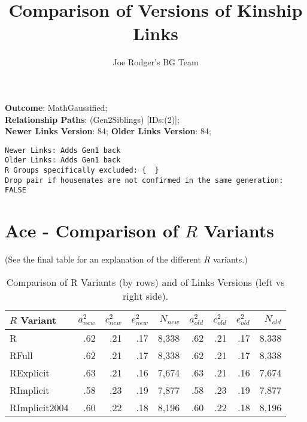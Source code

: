 \documentclass{article}\usepackage[]{graphicx}\usepackage[]{color}
\title{Comparison of Versions of Kinship Links}
\author{Joe Rodger's BG Team}
\makeatletter
\newenvironment{kframe}{%
 \def\at@end@of@kframe{}%
 \ifinner\ifhmode%
  \def\at@end@of@kframe{\end{minipage}}%
  \begin{minipage}{\columnwidth}%
 \fi\fi%
 \def\FrameCommand##1{\hskip\@totalleftmargin \hskip-\fboxsep
 \colorbox{shadecolor}{##1}\hskip-\fboxsep
     \hskip-\linewidth \hskip-\@totalleftmargin \hskip\columnwidth}%
 \MakeFramed {\advance\hsize-\width
   \@totalleftmargin\z@ \linewidth\hsize
   \@setminipage}}%
 {\par\unskip\endMakeFramed%
 \at@end@of@kframe}
\newenvironment{knitrout}{}{} %
\makeatother
\begin{document}
\maketitle
\setcounter{totalnumber}{8} %

\setlength{\parindent}{0pt}%











\textbf{Outcome}: MathGaussified;\\
\textbf{Relationship Paths}: (Gen2Siblings) [IDs:(2)];\\
\textbf{Newer Links Version}: 84;
\textbf{Older Links Version}: 84;

\begin{knitrout}
\color{fgcolor}\begin{kframe}
\begin{verbatim}
Newer Links: Adds Gen1 back
Older Links: Adds Gen1 back
R Groups specifically excluded: {  }
Drop pair if housemates are not confirmed in the same generation: FALSE
\end{verbatim}
\end{kframe}
\end{knitrout}





\section{Ace - Comparison of $R$ Variants} 
(See the final table for an explanation of the different $R$ variants.)
\begin{table}[ht]
\centering
{\large
\begin{tabular}{l|rrrr|rrrr}
  \hline
$R$ Variant & $a_{new}^2$ & $c_{new}^2$ & $e_{new}^2$ & $N_{new}$ & $a_{old}^2$ & $c_{old}^2$ & $e_{old}^2$ & $N_{old}$ \\ 
  \hline
R & .62 & .21 & .17 & 8,338 & .62 & .21 & .17 & 8,338 \\ 
  RFull & .62 & .21 & .17 & 8,338 & .62 & .21 & .17 & 8,338 \\ 
  RExplicit & .63 & .21 & .16 & 7,674 & .63 & .21 & .16 & 7,674 \\ 
  RImplicit & .58 & .23 & .19 & 7,877 & .58 & .23 & .19 & 7,877 \\ 
  RImplicit2004 & .60 & .22 & .18 & 8,196 & .60 & .22 & .18 & 8,196 \\ 
   \hline
\end{tabular}
}
\caption{Comparison of R Variants (by rows) and of Links Versions (left vs right side).} 
\end{table}
\end{document}
